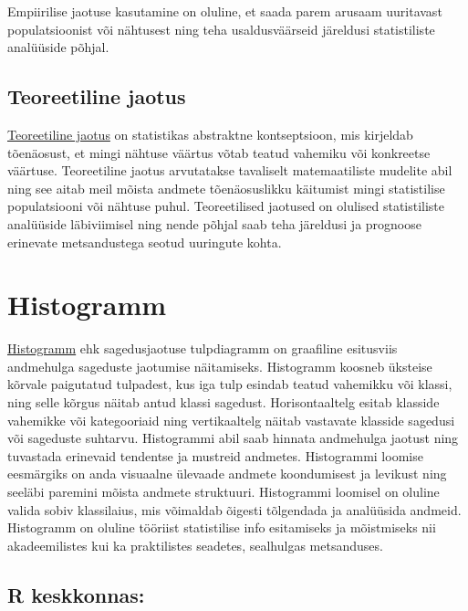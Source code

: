 \documentclass[
]{book}
\begin{document}
Empiirilise jaotuse kasutamine on oluline, et saada parem arusaam uuritavast populatsioonist või nähtusest ning teha usaldusväärseid järeldusi statistiliste analüüside põhjal.

\subsection{Teoreetiline jaotus}\label{teoreetiline-jaotus}

\href{https://sonaveeb.ee/search/unif/dlall/aso/teoreetiline\%20jaotus/1/est}{Teoreetiline jaotus} on statistikas abstraktne kontseptsioon, mis kirjeldab tõenäosust, et mingi nähtuse väärtus võtab teatud vahemiku või konkreetse väärtuse. Teoreetiline jaotus arvutatakse tavaliselt matemaatiliste mudelite abil ning see aitab meil mõista andmete tõenäosuslikku käitumist mingi statistilise populatsiooni või nähtuse puhul. Teoreetilised jaotused on olulised statistiliste analüüside läbiviimisel ning nende põhjal saab teha järeldusi ja prognoose erinevate metsandustega seotud uuringute kohta.

\section{Histogramm}\label{histogramm}

\href{https://sonaveeb.ee/search/unif/dlall/aso/histogramm/1/est}{Histogramm} ehk sagedusjaotuse tulpdiagramm on graafiline esitusviis andmehulga sageduste jaotumise näitamiseks. Histogramm koosneb üksteise kõrvale paigutatud tulpadest, kus iga tulp esindab teatud vahemikku või klassi, ning selle kõrgus näitab antud klassi sagedust. Horisontaaltelg esitab klasside vahemikke või kategooriaid ning vertikaaltelg näitab vastavate klasside sagedusi või sageduste suhtarvu. Histogrammi abil saab hinnata andmehulga jaotust ning tuvastada erinevaid tendentse ja mustreid andmetes. Histogrammi loomise eesmärgiks on anda visuaalne ülevaade andmete koondumisest ja levikust ning seeläbi paremini mõista andmete struktuuri. Histogrammi loomisel on oluline valida sobiv klassilaius, mis võimaldab õigesti tõlgendada ja analüüsida andmeid. Histogramm on oluline tööriist statistilise info esitamiseks ja mõistmiseks nii akadeemilistes kui ka praktilistes seadetes, sealhulgas metsanduses.

\subsection{R keskkonnas:}\label{r-keskkonnas}
\end{document}
